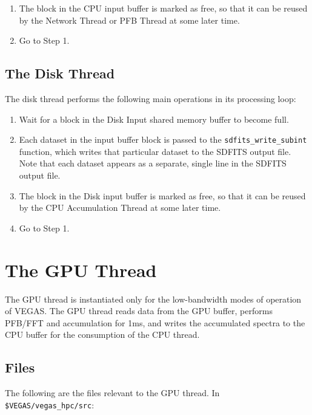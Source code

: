 \documentclass[11pt]{article} %
\begin{document}
\begin{enumerate}
\item The block in the CPU input buffer is marked as free, so that it can be reused by the Network Thread or PFB Thread at some later time.
\item Go to Step 1.

\end{enumerate}

\subsection{The Disk Thread}

The disk thread performs the following main operations in its processing loop:
\begin{enumerate}
\item Wait for a block in the Disk Input shared memory buffer to become full.
\item Each dataset in the input buffer block is passed to the \texttt{sdfits\_write\_subint} function, which writes that particular dataset to the SDFITS output file. Note that each dataset appears as a separate, single line in the SDFITS output file.
\item The block in the Disk input buffer is marked as free, so that it can be reused by the CPU Accumulation Thread at some later time.
\item Go to Step 1.
\end{enumerate}



\clearpage
\section{The GPU Thread}
\label{gpu-section}

The GPU thread is instantiated only for the low-bandwidth modes of operation of
VEGAS. The GPU thread reads data from the GPU buffer, performs PFB/FFT and
accumulation for 1ms, and writes the accumulated spectra to the CPU buffer for
the consumption of the CPU thread.

\subsection{Files}

The following are the files relevant to the GPU thread. In {\tt \$VEGAS/vegas\_hpc/src}:

\vspace{11pt}
\end{document}
